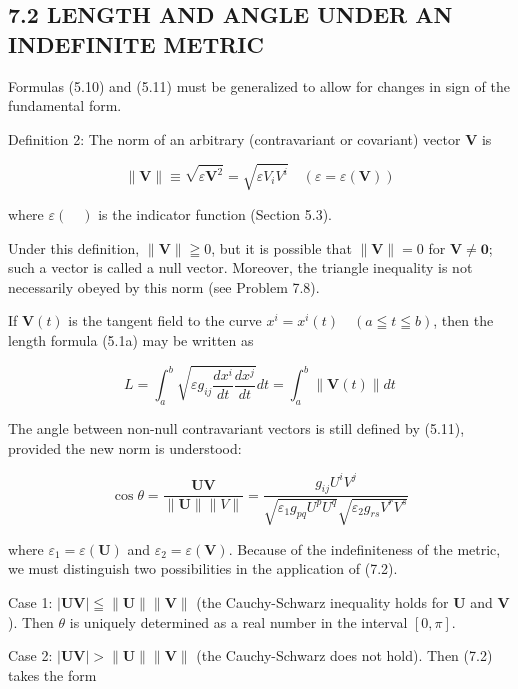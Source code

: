 \documentclass[10pt]{article}
\begin{document}
\subsection*{7.2 LENGTH AND ANGLE UNDER AN INDEFINITE METRIC}
Formulas (5.10) and (5.11) must be generalized to allow for changes in sign of the fundamental form.

Definition 2: The norm of an arbitrary (contravariant or covariant) vector $\mathbf{V}$ is

$$
\|\mathbf{V}\| \equiv \sqrt{\varepsilon \mathbf{V}^{2}}=\sqrt{\varepsilon V_{i} V^{i}} \quad(\varepsilon=\varepsilon(\mathbf{V}))
$$

where $\varepsilon(\quad)$ is the indicator function (Section 5.3).

Under this definition, $\|\mathbf{V}\| \geqq 0$, but it is possible that $\|\mathbf{V}\|=0$ for $\mathbf{V} \neq \mathbf{0}$; such a vector is called a null vector. Moreover, the triangle inequality is not necessarily obeyed by this norm (see Problem 7.8).

If $\mathbf{V}(t)$ is the tangent field to the curve $x^{i}=x^{i}(t) \quad(a \leqq t \leqq b)$, then the length formula (5.1a) may be written as


\begin{equation*}
L=\int_{a}^{b} \sqrt{\varepsilon g_{i j} \frac{d x^{i}}{d t} \frac{d x^{j}}{d t}} d t=\int_{a}^{b}\|\mathbf{V}(t)\| d t \tag{7.1}
\end{equation*}


The angle between non-null contravariant vectors is still defined by (5.11), provided the new norm is understood:


\begin{equation*}
\cos \theta=\frac{\mathbf{U V}}{\|\mathbf{U}\|\|V\|}=\frac{g_{i j} U^{i} V^{j}}{\sqrt{\varepsilon_{1} g_{p q} U^{p} U^{q}} \sqrt{\varepsilon_{2} g_{r s} V^{r} V^{s}}} \tag{7.2}
\end{equation*}


where $\varepsilon_{1}=\varepsilon(\mathbf{U})$ and $\varepsilon_{2}=\varepsilon(\mathbf{V})$. Because of the indefiniteness of the metric, we must distinguish two possibilities in the application of (7.2).

Case 1: $|\mathbf{U V}| \leqq\|\mathbf{U}\|\|\mathbf{V}\|$ (the Cauchy-Schwarz inequality holds for $\mathbf{U}$ and $\mathbf{V}$ ). Then $\theta$ is uniquely determined as a real number in the interval $[0, \pi]$.

Case 2: $|\mathbf{U V}|>\|\mathbf{U}\|\|\mathbf{V}\|$ (the Cauchy-Schwarz does not hold). Then (7.2) takes the form
\end{document}
